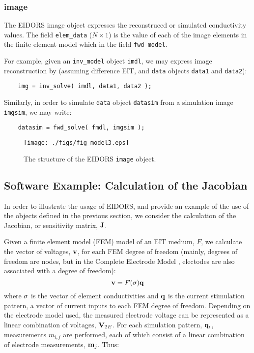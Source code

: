 \documentclass[12pt]{iopart}
\begin{document}
\subsubsection{image}

The EIDORS image object expresses the reconstruced or
simulated conductivity values. The field {\tt elem\_data}
($N\times1$) is the value of each of the image elements in 
the finite element model which in the field {\tt fwd\_model}.

For example, given
an {\tt inv\_model} object {\tt imdl}, we may express
image reconstruction by (assuming
difference EIT, and {\tt data} objects {\tt data1} and {\tt data2}):
\begin{verbatim}
    img = inv_solve( imdl, data1, data2 );
\end{verbatim}
Similarly, in order to simulate {\tt data} object {\tt datasim}
from a simulation image {\tt imgsim}, we may write:
\begin{verbatim}
    datasim = fwd_solve( fmdl, imgsim );
\end{verbatim}
%
%
\begin{figure}[th]
\begin{flushright}
\texttt{[image: ./figs/fig\_model3.eps]}
\caption{\small The structure of the EIDORS {\tt image} object.
\label{fig:image}
 }
\end{flushright}
\end{figure}


\subsection{Software Example: Calculation of the Jacobian}

In order to illustrate the usage of EIDORS, and provide
an example of the use of the objects defined in the previous
section, we consider
the calculation of the Jacobian, or sensitivity matrix,
$\bf J$.

Given a finite element model (FEM) model of an EIT medium,
$F$, we calculate the vector of voltages, $\bf v$, 
for each FEM degree of freedom
 (mainly, degrees of freedom are nodes, but in the
 Complete Electrode Model \cite{Cheng_etal_1989},
 electodes are also associated
 with a degree of freedom):
\begin{equation}
{\bf v} = F({\bf \sigma}){\bf q} 
\end{equation}
where $\bf \sigma$ is the vector of element conductivities
and $\bf q$ is the current stimulation pattern, a vector
of current inputs to each FEM degree of freedom.
Depending on the electrode model used, the measured electrode
voltage can be represented as a linear combination of 
voltages, ${\bf V}_{2E}$.
For each simulation pattern, ${\bf q}_{i}$,
measurements $m_{i,j}$
are performed, each of which consist of a linear combination of
electrode measurements, ${\bf m}_j$.
Thus:
\end{document}
